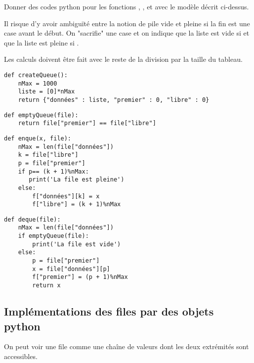 \begin{Exercise}[title = {Implémentations d'une file à d'une liste circulaire}]\it 

Donner des codes python pour les fonctions  ,  ,   et  avec le modèle décrit ci-dessus.
\end{Exercise} 
\begin{Answer}
Il risque d'y avoir ambiguïté entre la notion de pile vide et pleine si la fin est une case avant le début. On "sacrifie" une case et on indique que la liste est vide si  et que la liste est pleine si .

Les calculs doivent être fait avec le reste de la division par la taille du tableau.

\begin{lstlisting}
def createQueue():
    nMax = 1000
    liste = [0]*nMax
    return {"données" : liste, "premier" : 0, "libre" : 0}
\end{lstlisting}

\begin{lstlisting}
def emptyQueue(file):
    return file["premier"] == file["libre"]
\end{lstlisting}

\begin{lstlisting}
def enque(x, file):
    nMax = len(file["données"])
    k = file["libre"]
    p = file["premier"]
    if p== (k + 1)%nMax:
       print('La file est pleine')
    else:
        f["données"][k] = x
        f["libre"] = (k + 1)%nMax
\end{lstlisting}

\begin{lstlisting}
def deque(file):
    nMax = len(file["données"])
    if emptyQueue(file):
        print('La file est vide')
    else:
        p = file["premier"]
        x = file["données"][p]
        f["premier"] = (p + 1)%nMax
        return x
\end{lstlisting}
\end{Answer}%
\subsection{Implémentations des files par des objets python}
On peut voir une file comme une chaîne de valeurs dont les deux extrémités sont accessibles.

